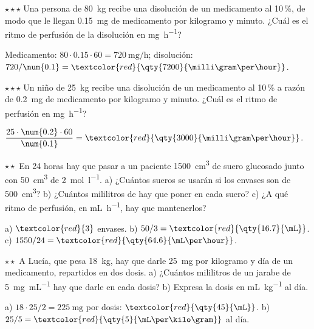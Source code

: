 \begin{exercise}
    \(\star\star\star\) Una persona de \qty{80}{\kilo\gram} recibe una disolución de un medicamento al 10\,\%, de modo que le llegan
    \qty{0.15}{\milli\gram} de medicamento por kilogramo y minuto. ¿Cuál es el ritmo de perfusión de la disolución en
    \unit{\milli\gram\per\hour}?
    \begin{solu}
        Medicamento: \(80 \cdot \num{0.15} \cdot 60 = \qty{720}{\milli\gram\per\hour}\); disolución: \(720/\num{0.1} = \textcolor{red}{\qty{7200}{\milli\gram\per\hour}}\).
    \end{solu}
\end{exercise}

\begin{exercise}
    \(\star\star\star\) Un niño de \qty{25}{\kilo\gram} recibe una disolución de un medicamento al 10\,\% a razón de
    \qty{0.2}{\milli\gram} de medicamento por kilogramo y minuto. ¿Cuál es el ritmo de perfusión en \unit{\milli\gram\per\hour}?
    \begin{solu}
        \(\dfrac{25 \cdot \num{0.2} \cdot 60}{\num{0.1}} = \textcolor{red}{\qty{3000}{\milli\gram\per\hour}}\).
    \end{solu}
\end{exercise}

\begin{exercise}
    \(\star\star\) En 24 horas hay que pasar a un paciente \qty{1500}{\cubic\cm} de suero glucosado junto con \qty{50}{\cubic\cm}
    de  \qty{2}{\mol\per\litre}. a) ¿Cuántos sueros se usarán si los envases son de \qty{500}{\cubic\cm}? b) ¿Cuántos
    mililitros de  hay que poner en cada suero? c) ¿A qué ritmo de perfusión, en \unit{\mL\per\hour}, hay que mantenerlos?
    \begin{solu}
        a) \(\textcolor{red}{3}\) envases. b) \(50/3 = \textcolor{red}{\qty{16.7}{\mL}}\). c) \(1550/24 = \textcolor{red}{\qty{64.6}{\mL\per\hour}}\).
    \end{solu}
\end{exercise}

\begin{exercise}
    \(\star\star\) A Lucía, que pesa \qty{18}{\kilo\gram}, hay que darle \qty{25}{\milli\gram} por kilogramo y día de un
    medicamento, repartidos en dos dosis. a) ¿Cuántos mililitros de un jarabe de \qty{5}{\milli\gram\per\mL} hay que darle en
    cada dosis? b) Expresa la dosis en \unit{\mL\per\kilo\gram} al día.
    \begin{solu}
        a) \(18 \cdot 25/2 = \qty{225}{\milli\gram}\) por dosis: \(\textcolor{red}{\qty{45}{\mL}}\). b) \(25/5 = \textcolor{red}{\qty{5}{\mL\per\kilo\gram}}\) al día.
    \end{solu}
\end{exercise}

